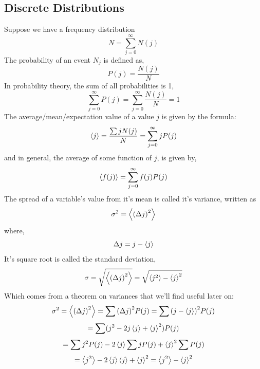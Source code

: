 \subsection{Discrete Distributions}
Suppose we have a frequency distribution 
\begin{equation}
N = \sum_{j=0}^{\infty} N(j)
\end{equation}
The probability of an event $N_{j}$ is defined as,
\begin{equation}
P(j) = \frac{N(j)}{N}
\end{equation}
In probability theory, the sum of all probabilities is 1,
\begin{equation}
\sum_{j = 0}^{\infty}P(j) = \sum_{j = 0}^{\infty}\frac{N(j)}{N} = 1
\end{equation}
The average/mean/expectation value of a value $j$ is given by the formula:
\begin{equation}
	\expval{j} = \frac{\sum j N(j)}{N} = \sum_{j =0 }^{\infty} j P(j)
\end{equation}
and in general, the average of some function of $j$, is given by,
\begin{equation}
\expval{f(j)} = \sum_{j =0 }^{\infty} f(j) P(j)
\end{equation}
The spread of a variable's value from it's mean is called it's variance, written as
\begin{equation}
\sigma^{2} = \expval{{(\Delta j)}^{2}}
\end{equation}
where,
$$\Delta j = j - \expval{j}$$
It's square root is called the standard deviation,
\begin{equation}
\sigma = \sqrt{\expval{{(\Delta j)}^{2}}} =  \sqrt{\expval{j^{2}} - \expval{j}^{2}}
\end{equation}
Which comes from a theorem on variances that we'll find useful later on:
$$\sigma^{2} = \expval{{(\Delta j)}^{2}} = \sum {(\Delta j)}^{2} P(j) = \sum {(j- \expval{j})}^{2} P(j)$$
$$ = \sum (j^{2} - 2j \expval{j} + \expval{j}^{2}) P(j)$$
$$ = \sum j^{2}P(j) - 2 \expval{j} \sum jP(j) + \expval{j}^{2}\sum P(j)$$
$$ = \expval{j^{2}} - 2 \expval{j}\expval{j} + \expval{j}^{2} = \expval{j^{2}} - \expval{j}^{2}$$
